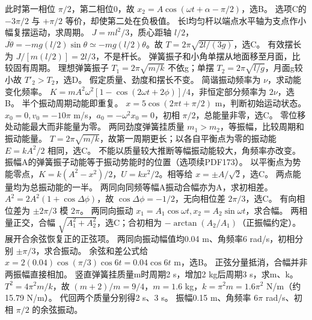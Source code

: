 \workings 此时第一相位 $\pi/2$，第二相位0，故 $x_2=A\cos(\omega t+\alpha-\pi/2)$，选B。
\crosscheck 选项C的 $-3\pi/2$ 与 $+\pi/2$ 等价，却使第二处在负极值。
\problemtext 长l均匀杆以端点水平轴为支点作小幅复摆运动，求周期。
\workings $J=ml^2/3$，质心距轴 $l/2$，$J\ddot\theta=-mg(l/2)\sin\theta\simeq-mg(l/2)\theta$。故 $T=2\pi\sqrt{2l/(3g)}$，选C。
\crosscheck 有效摆长为 $J/[m(l/2)]=2l/3$，不是杆长。
\problemtext 弹簧振子和小角单摆从地面移至月面，比较固有周期。
\workings 理想弹簧振子 $T_1=2\pi\sqrt{m/k}$ 不依g；单摆 $T_2=2\pi\sqrt{l/g}$，月面g较小故 $T'_2>T_2$，选D。
\crosscheck 假定质量、劲度和摆长不变。
\problemtext 简谐振动频率为 $\nu$，求动能变化频率。
\workings $K=mA^2\omega^2[1-\cos(2\omega t+2\phi)]/4$，非恒定部分频率为 $2\nu$，选B。
\crosscheck 半个振动周期动能即重复。
\problemtext $x=5\cos(2\pi t+\pi/2)$ m，判断初始运动状态。
\workings $x_0=0,v_0=-10\pi$ m/s，$a_0=-\omega^2x_0=0$，初相 $\pi/2$，总能量非零，选C。
\crosscheck 零位移处动能最大而非能量为零。
\problemtext 两同劲度弹簧挂质量 $m_1>m_2$，等振幅，比较周期和振动能量。
\workings $T=2\pi\sqrt{m/k}$，故第一周期更长；以各自平衡点为零的振动能 $E=kA^2/2$ 相同，选C。
\crosscheck 不能以质量较大推断等幅振动能较大，角频率亦改变。
\problemtext 振幅A的弹簧振子动能等于振动势能时的位置（选项续PDF173）。
\workings 以平衡点为势能零点，$K=k(A^2-x^2)/2$，$U=kx^2/2$。相等给 $x=\pm A/\sqrt2$，选C。
\crosscheck 两点能量均为总振动能的一半。
\problemtext 两同向同频等幅A振动合幅亦为A，求初相差。
\workings $A^2=2A^2(1+\cos\Delta\phi)$，故 $\cos\Delta\phi=-1/2$，无向相位差 $2\pi/3$，选C。
\crosscheck 有向相位差为 $\pm2\pi/3$ 模 $2\pi$。
\problemtext 两同向振动 $x_1=A_1\cos\omega t,x_2=A_2\sin\omega t$，求合幅。
\workings 两相量正交，合幅 $\sqrt{A_1^2+A_2^2}$，选C；合初相为 $-\arctan(A_2/A_1)$（正振幅约定）。
\crosscheck 展开合余弦恢复正的正弦项。
\problemtext 两同向振动幅值均0.04 m、角频率6 rad/s，初相分别 $\pm\pi/3$，求合振动。
\workings 余弦和差公式给 $x=2(0.04)\cos(\pi/3)\cos6t=0.04\cos6t$ m，选B。
\crosscheck 正弦分量抵消，合幅并非两振幅直接相加。
\problemtext 竖直弹簧挂质量m时周期2 s，增加2 kg后周期3 s，求m、k。
\workings $T^2=4\pi^2m/k$，故 $(m+2)/m=9/4$，$m=1.6$ kg，$k=\pi^2m=1.6\pi^2$ N/m（约15.79 N/m）。
\crosscheck 代回两个质量分别得2 s、3 s。
\problemtext 振幅0.15 m、角频率 $6\pi$ rad/s、初相 $\pi/2$ 的余弦振动。
